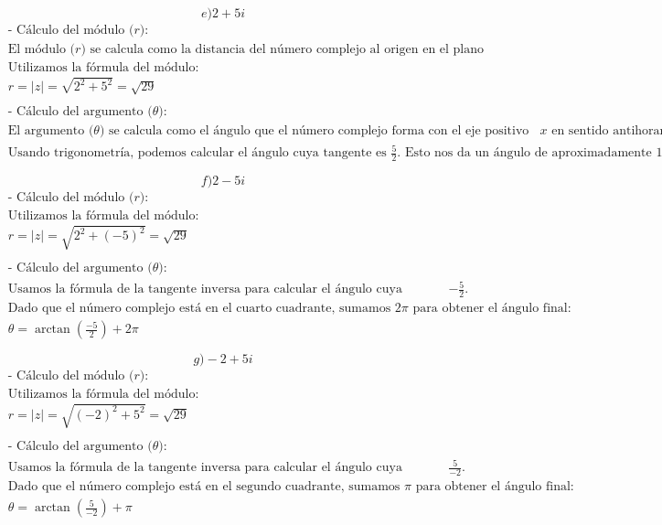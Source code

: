 \documentclass{article}
\begin{document}
\newpage
\[
e) 2+5i
\]
\begin{align*}
&\text{- Cálculo del módulo (\(r\)):} \\
&\text{El módulo (\(r\)) se calcula como la distancia del número complejo al origen en el plano complejo.} \\
&\text{Utilizamos la fórmula del módulo:} \\
& r = |z| = \sqrt{2^2 + 5^2} = \sqrt{29} \\
& \\
&\text{- Cálculo del argumento (\(\theta\)):} \\
&\text{El argumento (\(\theta\)) se calcula como el ángulo que el número complejo forma con el eje positivo de las \(x\) en sentido antihorario.} \\
&\text{Usando trigonometría, podemos calcular el ángulo cuya tangente es \(\frac{5}{2}\).  Esto nos da un ángulo de aproximadamente \(1.19029\) radianes.} \\
& \\
\end{align*}
\[
f) 2-5i
\]
\begin{align*}
&\text{- Cálculo del módulo (\(r\)):} \\
&\text{Utilizamos la fórmula del módulo:} \\
& r = |z| = \sqrt{2^2 + (-5)^2} = \sqrt{29} \\
& \\
&\text{- Cálculo del argumento (\(\theta\)):} \\
&\text{Usamos la fórmula de la tangente inversa para calcular el ángulo cuya tangente es \(-\frac{5}{2}\).} \\
&\text{Dado que el número complejo está en el cuarto cuadrante, sumamos \(2\pi\) para obtener el ángulo final:} \\
& \theta = \arctan\left(\frac{-5}{2}\right) + 2\pi \\
& \\
\end{align*}
\newpage
\[
g) -2+5i
\]
\begin{align*}
&\text{- Cálculo del módulo (\(r\)):} \\
&\text{Utilizamos la fórmula del módulo:} \\
& r = |z| = \sqrt{(-2)^2 + 5^2} = \sqrt{29} \\
& \\
&\text{- Cálculo del argumento (\(\theta\)):} \\
&\text{Usamos la fórmula de la tangente inversa para calcular el ángulo cuya tangente es \(\frac{5}{-2}\).} \\
&\text{Dado que el número complejo está en el segundo cuadrante, sumamos \(\pi\) para obtener el ángulo final:} \\
& \theta = \arctan\left(\frac{5}{-2}\right) + \pi \\
& \\
\end{align*}
\end{document}
